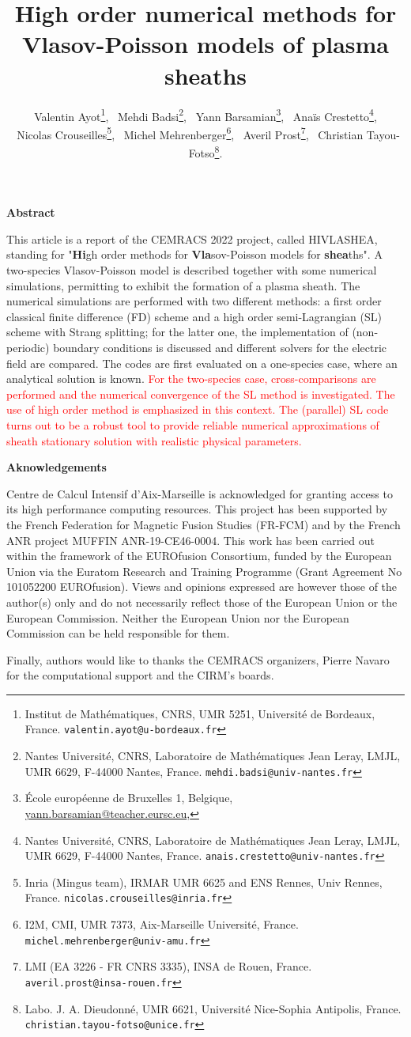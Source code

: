 \documentclass{article}
\title{High order numerical methods for Vlasov-Poisson models of plasma sheaths}
\author{
	Valentin Ayot\footnote{Institut de Math\'ematiques, CNRS, UMR 5251, Universit\'e de Bordeaux, France. \texttt{valentin.ayot@u-bordeaux.fr}}, 
	\ Mehdi Badsi\footnote{Nantes Universit\'e, CNRS, Laboratoire de Math\'ematiques Jean Leray, LMJL, UMR 6629, F-44000 Nantes, France. \texttt{mehdi.badsi@univ-nantes.fr}},
	\ Yann Barsamian\footnote{\'Ecole europ\'eenne de Bruxelles 1, Belgique, \url{yann.barsamian@teacher.eursc.eu}, \orcidlink{0000-0001-6602-0547}}, 
	\ Ana\"is Crestetto\footnote{Nantes Universit\'e, CNRS, Laboratoire de Math\'ematiques Jean Leray, LMJL, UMR 6629, F-44000 Nantes, France. \texttt{anais.crestetto@univ-nantes.fr}},\\
	\ Nicolas Crouseilles\footnote{Inria (Mingus team), IRMAR UMR 6625 and ENS Rennes, Univ Rennes, France. \texttt{nicolas.crouseilles@inria.fr}},
	\ Michel Mehrenberger\footnote{I2M, CMI, UMR 7373, Aix-Marseille Universit\'e, France. \texttt{michel.mehrenberger@univ-amu.fr}},
	\ Averil Prost\footnote{LMI (EA 3226 - FR CNRS 3335), INSA de Rouen, France. \texttt{averil.prost@insa-rouen.fr}}, 
	\ Christian Tayou-Fotso\footnote{Labo. J. A. Dieudonn\'e, UMR 6621, Universit\'e Nice-Sophia Antipolis, France. \texttt{christian.tayou-fotso@unice.fr}}.
 }
\date{}
\numberwithin{equation}{section}
\newcommand{\todo}[1]{{\color{red}\textbf{#1}}}
\newcommand{\highlight}[2]{ %
	\begin{center}
		\small
		\begin{minipage}{0.9\textwidth}
			\begin{center}
				\textbf{#1}
			\end{center}
			\vspace*{-7pt}
			#2
		\end{minipage}
	\end{center}
}
\begin{document}
	
\maketitle

\highlight{Abstract}{
	This article is a report of the CEMRACS 2022 project, called HIVLASHEA, standing for "{\bf Hi}gh order methods for {\bf Vla}sov-Poisson models for {\bf shea}ths".
	A two-species Vlasov-Poisson model is described together with some numerical simulations, permitting to exhibit the formation of a plasma sheath. 
	The numerical simulations are performed with two different methods: a first order classical finite difference (FD) scheme and a high order semi-Lagrangian (SL) scheme with Strang splitting; for the latter one, the implementation
	of (non-periodic) boundary conditions is discussed and different solvers for the electric field are compared.  
	The codes are first evaluated on a one-species case, where an analytical solution is known. \textcolor{red}{For the two-species case, 
	cross-comparisons are performed and the numerical convergence of the SL method is investigated. The use of high order method 
	is emphasized in this context. The (parallel) SL code turns out to be a robust tool to provide reliable numerical approximations of sheath stationary solution 
	with realistic physical parameters.  }
}

\highlight{Aknowledgements}{
	Centre de Calcul Intensif d'Aix-Marseille is acknowledged for granting access to its high performance computing resources. This project has been supported by  the French Federation for Magnetic Fusion Studies (FR-FCM) and by the French ANR project MUFFIN ANR-19-CE46-0004. 
	This work has been carried out within the framework of the EUROfusion Consortium, funded by the European Union via the Euratom Research and Training Programme (Grant Agreement No 101052200 EUROfusion). Views and opinions expressed are however those of the author(s) only and do not necessarily reflect those of the European Union or the European Commission. Neither the European Union nor the European Commission can be held responsible for them.
	
	
	
	Finally, authors would like to thanks the CEMRACS organizers, Pierre Navaro for the computational support and the CIRM's boards.
}
\end{document}
